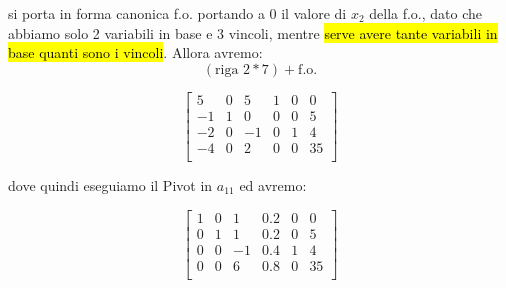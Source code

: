 si porta in forma canonica f.o. portando a $0$ il valore di $x_2$ della f.o., dato che abbiamo solo 2 variabili in base e 3 vincoli, mentre \hl{serve avere tante variabili in base quanti sono i vincoli}. Allora avremo:
$$(\text{riga 2} * 7) + \text{f.o.}$$

$$
\left[ {\begin{array}{cccccc}
	5 & 0 & 5 & 1 & 0 & 0\\
	-1 & 1 & 0 & 0 & 0 & 5\\
	-2 & 0 & -1 & 0 & 1 & 4\\
	-4 & 0 & 2 & 0 & 0 & 35\\
\end{array} } \right]
$$

dove quindi eseguiamo il Pivot in $a_{11}$ ed avremo:

$$
\left[ {\begin{array}{cccccc}
	1 & 0 & 1 & 0.2 & 0 & 0\\
	0 & 1 & 1 & 0.2 & 0 & 5\\
	0 & 0 & -1 & 0.4 & 1 & 4\\
	0 & 0 & 6 & 0.8 & 0 & 35\\
\end{array} } \right]
$$